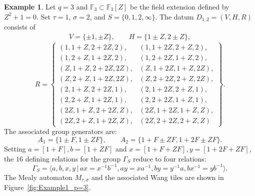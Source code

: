 \documentclass[12pt]{article}
\theoremstyle{definition}
\newtheorem{example}{Example}
\def\bF{{\mathbb F}}
\begin{document}
\begin{example}
Let $q=3$ and $\bF_3\subset\bF_3[Z]$ be the field extension defined by $Z^2+1=0$. Set $\tau=1$, $\sigma=2$, and $S=\{0,1,2,\infty\}$. The datum $D_{1,2}=(V,H,R)$ consists of
\begin{align*}
V=\{ \pm 1, \pm Z\},  \qquad  H=\{ 1\pm Z, 2\pm Z \},
\end{align*}
$$
R = \left\{
\begin{array}{ll}
(1, 1+Z, 2+2Z, 2), & (1, 1+2Z, 2+Z, 2), \\
(1, 2+Z, 1+2Z, 2), & (1, 2+2Z, 1+Z, 2), \\
(Z, 1+Z, 2+2Z, 2Z), & (Z, 1+2Z, 1+Z, 2Z), \\
(Z, 2+Z, 1+2Z, 2Z), & (Z, 2+2Z, 2+Z, 2Z), \\
(2, 1+Z, 2+2Z, 1), & (2, 1+2Z, 2+Z, 1), \\
(2, 2+Z, 1+2Z, 1), & (2, 2+2Z, 1+Z, 1), \\
(2Z, 1+Z, 2+2Z, Z), & (2Z, 1+2Z, 1+Z, Z), \\
(2Z, 2+Z, 1+2Z, Z), & (2Z, 2+2Z, 2+Z, Z)
\end{array}
\right\}.
$$
The associated group generators are:
\[
A_{1}=\{ 1\pm F, 1\pm ZF \}, \qquad  A_{2}=\{ 1+F\pm ZF, 1+2F\pm ZF \}.
\]
Setting $a=[1+F], b=[1+ZF]$ and $x=[1+F+ZF], y=[1+2F+ZF]$, the $16$ defining relations for the group $\Gamma_S$ reduce to four relations:
\[
\Gamma_S=\langle a,b,x,y\,|\, ax=x^{-1}b^{-1}, ay=xa^{-1}, by=y^{-1}a, bx^{-1}=yb^{-1}\rangle.
\]
The Mealy automaton $M_{\tau,\sigma}$ and the associated Wang tiles are shown in Figure~\ref{fig:Example1_p=3}.
\end{example}




\end{document}
